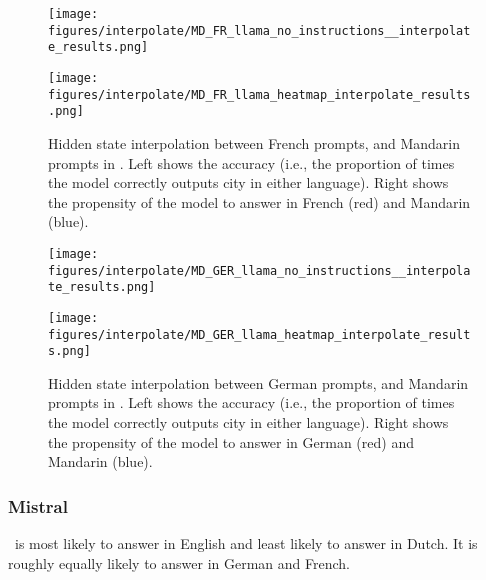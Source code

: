 \begin{figure}[h]
\begin{minipage}{0.49\textwidth}
    \centering
    \texttt{[image: figures/interpolate/MD\_FR\_llama\_no\_instructions\_\_interpolate\_results.png]} 
\end{minipage}
\begin{minipage}{0.49\textwidth}
    \centering
    \texttt{[image: figures/interpolate/MD\_FR\_llama\_heatmap\_interpolate\_results.png]} 
\end{minipage}
\caption{Hidden state interpolation between French prompts, and Mandarin prompts in \llama. Left shows the accuracy (i.e., the proportion of times the model correctly outputs city in either language). Right shows the propensity of the model to answer in French (red) and Mandarin (blue). }
\end{figure}


\begin{figure}[h]
\begin{minipage}{0.49\textwidth}
    \centering
    \texttt{[image: figures/interpolate/MD\_GER\_llama\_no\_instructions\_\_interpolate\_results.png]} 
\end{minipage}
\begin{minipage}{0.49\textwidth}
    \centering
    \texttt{[image: figures/interpolate/MD\_GER\_llama\_heatmap\_interpolate\_results.png]} 
\end{minipage}
\caption{Hidden state interpolation between German prompts, and Mandarin prompts in \llama. Left shows the accuracy (i.e., the proportion of times the model correctly outputs city in either language). Right shows the propensity of the model to answer in German (red) and Mandarin (blue). }
\end{figure}


\FloatBarrier
\newpage 

\subsubsection{Mistral}
\mistral \ is most likely to answer in English and least likely to answer in Dutch. It is roughly equally likely to answer in German and French.



